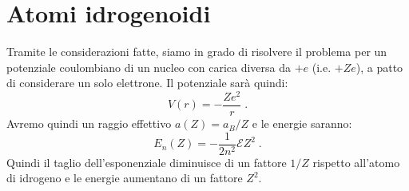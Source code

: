 \documentclass[10pt,a4paper]{report}
\theoremstyle{definition}
\numberwithin{equation}{section}
\begin{document}
\section{Atomi idrogenoidi}
Tramite le considerazioni fatte, siamo in grado di risolvere il problema per un potenziale coulombiano di un nucleo con carica diversa da $+e$ (i.e. $+Ze$), a patto di considerare un solo elettrone. Il potenziale sarà quindi:
\begin{equation}
V(r)=-\frac{Ze^2}{r}\;.
\end{equation}
Avremo quindi un raggio effettivo $a(Z)=a_B/Z$ e le energie saranno:
\begin{equation}
E_n(Z)=-\frac{1}{2n^2}\mathcal{E}Z^2\;.
\end{equation}
Quindi il taglio dell'esponenziale diminuisce di un fattore $1/Z$ rispetto all'atomo di idrogeno e le energie aumentano di un fattore $Z^2$.
\end{document}
